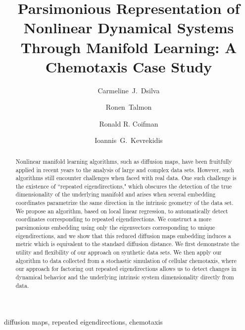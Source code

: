 \documentclass[3p]{elsarticle}
\begin{document}
\begin{frontmatter}

\title{Parsimonious Representation of Nonlinear Dynamical Systems Through Manifold Learning: A Chemotaxis Case Study}

\author[princeton]{Carmeline~J.~Dsilva}
%
\author[technion]{Ronen~Talmon}
%
\author[yale]{Ronald R. Coifman}
%
\author[princeton,princetonpacm]{Ioannis~G.~Kevrekidis }

\address[princeton]{Department of Chemical and Biological Engineering, Princeton University, Princeton, NJ, 08540, USA}
\address[technion]{Technion - Israel Institute of Technology, Haifa, 3200003, Israel}
\address[yale]{Department of Mathematics, Yale University, New Haven, CT, 06520, USA}
\address[princetonpacm]{Program in Applied and Computational Mathematics, Princeton University, Princeton, NJ, 08540, USA}
%


\begin{abstract}
%
Nonlinear manifold learning algorithms, such as diffusion maps, have been fruitfully
applied in recent years to the analysis of large and complex data sets.
%
However, such algorithms still encounter challenges when faced with real data.
%
One such 
challenge is the existence of ``repeated eigendirections," which obscures the detection of the 
true dimensionality of the underlying manifold and arises when several embedding coordinates parametrize
the same direction in the intrinsic geometry of the data set. 
%
We propose an algorithm, based on local linear regression, 
to automatically detect coordinates corresponding to repeated eigendirections.
%
We construct a more parsimonious embedding using only the eigenvectors corresponding to unique eigendirections, and we show that this reduced diffusion maps embedding induces 
a metric which is equivalent to the standard diffusion distance.
%
We first demonstrate the utility and flexibility of our approach on synthetic data sets.
%
We then apply our algorithm to data collected from a stochastic simulation of cellular chemotaxis, where our approach for factoring out repeated eigendirections allows us to detect changes in dynamical behavior and the underlying
intrinsic system dimensionality directly from data.
%
\end{abstract}


\begin{keyword}
diffusion maps, repeated eigendirections, chemotaxis
\end{keyword}

\end{frontmatter}
\end{document}
